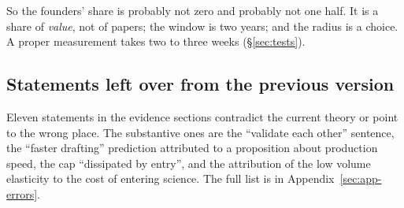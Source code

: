 So the founders' share is probably not zero and probably not one half. It is a share of \emph{value}, not of papers; the window is two years; and the radius is a choice. A proper measurement takes two to three weeks (\S\ref{sec:tests}).

\subsection{Statements left over from the previous version}

Eleven statements in the evidence sections contradict the current theory or point to the wrong place. The substantive ones are the ``validate each other'' sentence, the ``faster drafting'' prediction attributed to a proposition about production speed, the cap ``dissipated by entry'', and the attribution of the low volume elasticity to the cost of entering science. The full list is in Appendix~\ref{sec:app-errors}.
